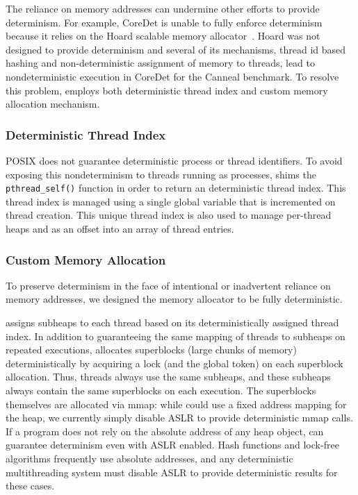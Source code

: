 The reliance on memory addresses can undermine other efforts to provide determinism. For example, CoreDet is unable to fully enforce determinism because it relies on the Hoard scalable memory allocator~\cite{Bergan:2010:CCR:1736020.1736029}. Hoard was not designed to provide determinism and several of its mechanisms, thread id based hashing and non-deterministic assignment of memory to threads, lead to nondeterministic execution in CoreDet for the Canneal benchmark. To resolve this problem, \dthreads{} employs both deterministic thread index and custom memory allocation mechanism. 

\subsubsection{Deterministic Thread Index}
\label{sec:threadindex}

POSIX does not guarantee deterministic process or thread identifiers. To avoid exposing this nondeterminism to threads running as processes, \dthreads{} shims the \texttt{pthread\_self()} function in order to return an deterministic thread index.  This thread index is managed using a single global variable that is incremented on thread creation.  This unique thread index is also used to manage per-thread heaps and as an offset into an array of thread entries.

\subsubsection{Custom Memory Allocation}

To preserve determinism in the face of intentional or inadvertent reliance on memory addresses, we designed the \dthreads{} memory allocator to be fully deterministic. 

\dthreads{} assigns subheaps to each thread based on its deterministically assigned thread index. In addition to guaranteeing the same mapping of threads to subheaps on repeated executions, \dthreads{} allocates superblocks (large chunks of memory) deterministically by acquiring a lock (and the global token) on each superblock allocation. Thus, threads always use the same subheaps, and these subheaps always contain the same superblocks on each execution. The superblocks themselves are allocated via mmap: while \dthreads{} could use a fixed address mapping for the heap, we currently simply disable ASLR to provide deterministic mmap calls. If a program does not rely on the absolute address of any heap object, \dthreads{} can guarantee determinism even with ASLR enabled. Hash functions and lock-free algorithms frequently use absolute addresses, and any deterministic multithreading system must disable ASLR to provide deterministic results for these cases.


